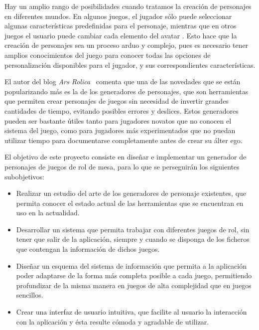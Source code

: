 Hay un amplio rango de posibilidades cuando tratamos la creación de personajes en diferentes mundos. En algunos juegos, el jugador 
sólo puede seleccionar algunas características predefinidas para el personaje, mientras que en otros juegos el usuario puede cambiar cada
elemento del avatar \autocite*{Isaksson2012}. Esto hace que la creación de personajes sea un proceso arduo y complejo, pues es necesario 
tener amplios conocimientos del juego para conocer todas las opciones de personalización disponibles para el jugador, y sus correspondientes 
características. \medskip



El autor del blog \textit{Ars Rolica}~\autocite*{ArsRolica} comenta que una de las novedades que se están popularizando más es la de los 
generadores de personajes, que son herramientas que permiten crear personajes de juegos sin necesidad de invertir grandes cantidades 
de tiempo, evitando posibles errores y deslices. Estos generadores pueden ser bastante útiles tanto para jugadores novatos que no 
conocen el sistema del juego, como para jugadores más experimentados que no puedan utilizar tiempo para documentarse completamente 
antes de crear su álter ego. \medskip

El objetivo de este proyecto consiste en diseñar e implementar un generador de personajes de juegos de rol de mesa, para lo que se 
perseguirán los siguientes subobjetivos:
\begin{itemize}

    \item Realizar un estudio del arte de los generadores de personaje existentes, que permita conocer el estado actual de las herramientas
    que se encuentran en uso en la actualidad.

    \item Desarrollar un sistema que permita trabajar con diferentes juegos de rol, sin tener que salir de la aplicación, siempre y 
    cuando se disponga de los ficheros que contengan la información de dichos juegos.

    \item Diseñar un esquema del sistema de información que permita a la aplicación poder adaptarse de la forma más completa posible a 
    cada juego, permitiendo profundizar de la misma manera en juegos de alta complejidad que en juegos sencillos.

    \item Crear una interfaz de usuario intuitiva, que facilite al usuario la interacción con la aplicación y ésta resulte cómoda y 
    agradable de utilizar.

\end{itemize}







